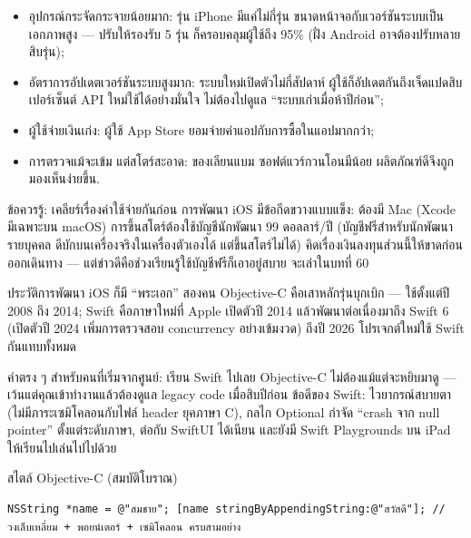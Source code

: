 \begin{itemize}
  \item อุปกรณ์กระจัดกระจายน้อยมาก: รุ่น iPhone มีแค่ไม่กี่รุ่น ขนาดหน้าจอกับเวอร์ชันระบบเป็นเอกภาพสูง — ปรับให้รองรับ 5 รุ่น ก็ครอบคลุมผู้ใช้ถึง 95\% (ฝั่ง Android อาจต้องปรับหลายสิบรุ่น);
  \item อัตราการอัปเดตเวอร์ชันระบบสูงมาก: ระบบใหม่เปิดตัวไม่กี่สัปดาห์ ผู้ใช้ก็อัปเดตกันถึงเจ็ดแปดสิบเปอร์เซ็นต์ API ใหม่ใช้ได้อย่างมั่นใจ ไม่ต้องไปดูแล “ระบบเก่าเมื่อห้าปีก่อน”;
  \item ผู้ใช้จ่ายเงินเก่ง: ผู้ใช้ App Store ยอมจ่ายค่าแอปกับการซื้อในแอปมากกว่า;
  \item การตรวจแม้จะเข้ม แต่สโตร์สะอาด: ของเลียนแบม ซอฟต์แวร์กวนโอนมีน้อย ผลิตภัณฑ์ดีจึงถูกมองเห็นง่ายขึ้น.
\end{itemize}

\begin{tcbwarn}{ข้อควรรู้: เคลียร์เรื่องค่าใช้จ่ายกันก่อน}
การพัฒนา iOS มีข้อกีดขวางแบบแข็ง: ต้องมี Mac (Xcode มีเฉพาะบน macOS) การขึ้นสโตร์ต้องใช้บัญชีนักพัฒนา 99 ดอลลาร์/ปี (บัญชีฟรีสำหรับนักพัฒนารายบุคคล ดีบักบนเครื่องจริงในเครื่องตัวเองได้ แต่ขึ้นสโตร์ไม่ได้) คิดเรื่องเงินลงทุนส่วนนี้ให้ขาดก่อนออกเดินทาง — แต่ข่าวดีคือช่วงเรียนรู้ใช้บัญชีฟรีก็เอาอยู่สบาย จะเล่าในบทที่ 60

\end{tcbwarn}


ประวัติการพัฒนา iOS ก็มี “พระเอก” สองคน Objective-C คือเสาหลักรุ่นบุกเบิก — ใช้ตั้งแต่ปี 2008 ถึง 2014; Swift คือภาษาใหม่ที่ Apple เปิดตัวปี 2014 แล้วพัฒนาต่อเนื่องมาถึง Swift 6 (เปิดตัวปี 2024 เพิ่มการตรวจสอบ concurrency อย่างเข้มงวด) ถึงปี 2026 โปรเจกต์ใหม่ใช้ Swift กันแทบทั้งหมด

คำตรง ๆ สำหรับคนที่เริ่มจากศูนย์: เรียน Swift ไปเลย Objective-C ไม่ต้องแม้แต่จะหยิบมาดู — เว้นแต่คุณเข้าทำงานแล้วต้องดูแล legacy code เมื่อสิบปีก่อน ข้อดีของ Swift: ไวยากรณ์สบายตา (ไม่มีภาระเซมิโคลอนกับไฟล์ header ยุคภาษา C), กลไก Optional กำจัด “crash จาก null pointer” ตั้งแต่ระดับภาษา, ต่อกับ SwiftUI ได้เนียน และยังมี Swift Playgrounds บน iPad ให้เรียนไปเล่นไปไปด้วย

สไตล์ Objective-C (สมบัติโบราณ)

\begin{lstlisting}
NSString *name = @"สมชาย"; [name stringByAppendingString:@"สวัสดี"]; // วงเล็บเหลี่ยม + พอยน์เตอร์ + เซมิโคลอน ครบสามอย่าง
\end{lstlisting}

